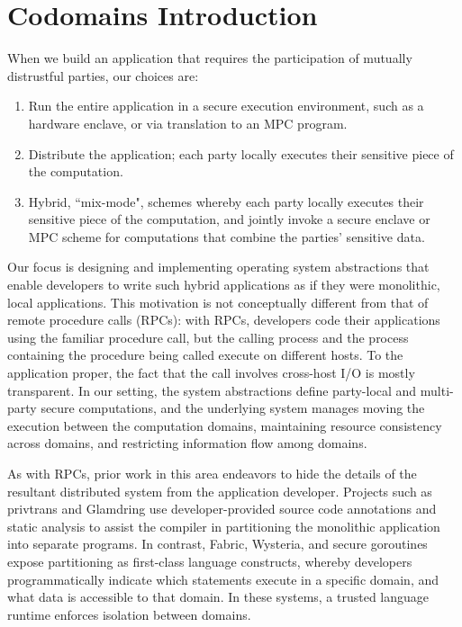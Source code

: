 \section{Codomains Introduction}
\label{sec:codomains-intro}


When we build an application that requires the participation of mutually
distrustful parties, our choices are: 
%
\begin{enumerate}
    \item Run the entire application in a secure execution environment, such as
        a hardware enclave, or via translation to an MPC program.

    \item Distribute the application;  each party locally executes
        their sensitive piece of the computation.

    \item Hybrid, ``mix-mode", schemes whereby each party locally executes
        their sensitive piece of the computation, and jointly invoke a secure
        enclave or MPC scheme for computations that combine the parties'
        sensitive data.
\end{enumerate}


Our focus is designing and implementing operating system abstractions 
that enable developers to write such hybrid applications as if they were
monolithic, local applications.
%
This motivation is not conceptually different from that of 
remote procedure calls (RPCs):  with RPCs, developers code their applications
using the familiar procedure call, but the calling process and the
process containing the procedure being called execute on different
hosts.
%
To the application proper, the fact that the call involves cross-host I/O
is mostly transparent.
%
In our setting, the system abstractions define party-local and multi-party
secure computations, and the underlying system manages moving the execution
between the computation domains, maintaining resource consistency across
domains, and restricting information flow among domains.



As with RPCs, prior work in this area endeavors to hide the details of the
resultant distributed system from the application developer.  
%
Projects such as privtrans and Glamdring use developer-provided source code
annotations and static analysis to assist the compiler in partitioning the
monolithic application into separate programs.
%
In contrast, Fabric, Wysteria, and secure goroutines expose partitioning as
first-class language constructs, whereby developers programmatically indicate
which statements execute in a specific domain, and what data is accessible to
that domain.
%
In these systems, a trusted language runtime enforces isolation between
domains.


